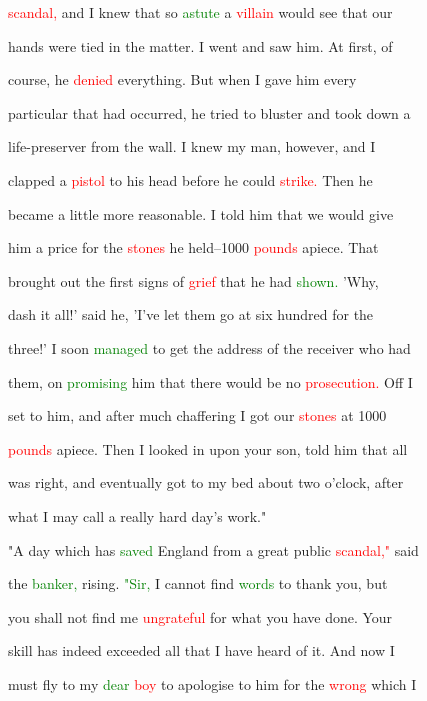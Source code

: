  \textcolor{red}{scandal,} and I knew that so \textcolor{green}{astute} a \textcolor{red}{villain} would see that our

 hands were tied in the matter. I went and saw him. At first, of

 course, he \textcolor{red}{denied} everything. But when I gave him every

 particular that had occurred, he tried to bluster and took down a

 life-preserver from the wall. I knew my man, however, and I

 clapped a \textcolor{red}{pistol} to his head before he could \textcolor{red}{strike.} Then he

 became a little more reasonable. I told him that we would give

 him a price for the \textcolor{red}{stones} he held--1000 \textcolor{red}{pounds} apiece. That

 brought out the first signs of \textcolor{red}{grief} that he had \textcolor{green}{shown.} 'Why,

 dash it all!' said he, 'I've let them go at six hundred for the

 three!' I soon \textcolor{green}{managed} to get the address of the receiver who had

 them, on \textcolor{green}{promising} him that there would be no \textcolor{red}{prosecution.} Off I

 set to him, and after much chaffering I got our \textcolor{red}{stones} at 1000

 \textcolor{red}{pounds} apiece. Then I looked in upon your son, told him that all

 was right, and eventually got to my bed about two o'clock, after

 what I may call a really hard day's work."



 "A day which has \textcolor{green}{saved} England from a great \textcolor{BurntOrange}{public} \textcolor{red}{scandal,"} said

 the \textcolor{green}{banker,} rising. \textcolor{green}{"Sir,} I cannot find \textcolor{green}{words} to thank you, but

 you shall not find me \textcolor{red}{ungrateful} for what you have done. Your

 skill has indeed \textcolor{BurntOrange}{exceeded} all that I have heard of it. And now I

 must fly to my \textcolor{green}{dear} \textcolor{red}{boy} to apologise to him for the \textcolor{red}{wrong} which I

